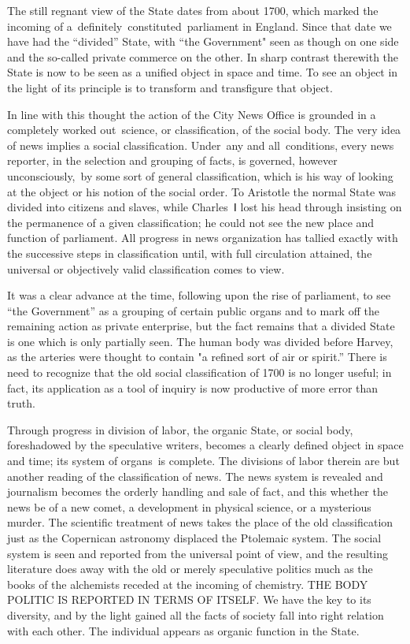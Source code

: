 \documentclass[twoside,symmetric,nobib,justified]{tufte-book}
\begin{document}
The still regnant view of the State dates from about 1700, which marked
the incoming of a~definitely~constituted~parliament in England. Since
that date we have had the ``divided'' State, with ``the Government" seen
as though on one side and the so-called private commerce on the other.
In sharp contrast therewith the State is now to be seen as a unified
object in space and time. To see an object in the light of its principle
is to transform and transfigure that object.~~

In line with this thought the action of the City News Office is grounded
in a completely worked out~science, or classification, of the social
body. The very idea of news implies a social classification. Under~any
and all~conditions, every news reporter, in the selection and grouping
of facts, is governed, however unconsciously,~by some sort of general
classification, which is his way of looking at the object or his notion
of the social order. To Aristotle the normal State was divided into
citizens and slaves, while Charles~Ⅰ lost his head through insisting on
the permanence of a given classification; he could not see the new place
and function of parliament. All progress in news organization has
tallied exactly with the successive steps in classification until, with
full circulation attained, the universal or objectively valid
classification comes to view.~

It was a clear advance at the time, following upon the rise of
parliament, to see ``the Government'' as a grouping of certain public
organs and to mark off the remaining action as private enterprise, but
the fact remains that a divided State is one which is only partially
seen. The human body was divided before Harvey, as the arteries were
thought to contain "a refined sort of air or spirit.'' There is need to
recognize that the old social classification of 1700 is no longer
useful; in fact, its application as a tool of inquiry is now productive
of more error than truth.~

Through progress in division of labor, the organic State, or social
body, foreshadowed by the speculative writers, becomes a clearly defined
object in space and time; its system of organs~is complete. The
divisions of labor therein are but another reading of the classification
of news. The news system is revealed and journalism becomes the orderly
handling and sale of fact, and this whether the news be of a new comet,
a development in physical science, or a mysterious murder. The
scientific treatment of news takes the place of the old classification
just as the Copernican astronomy displaced the Ptolemaic system. The
social system is seen and reported from the universal point of view, and
the resulting literature does away with the old or merely speculative
politics much as the books of the alchemists receded at the incoming of
chemistry. THE BODY POLITIC IS REPORTED IN TERMS OF ITSELF. We have the
key to its diversity, and by the light gained all the facts of society
fall into right relation with each other. The individual appears as
organic function in the State.~
\end{document}
